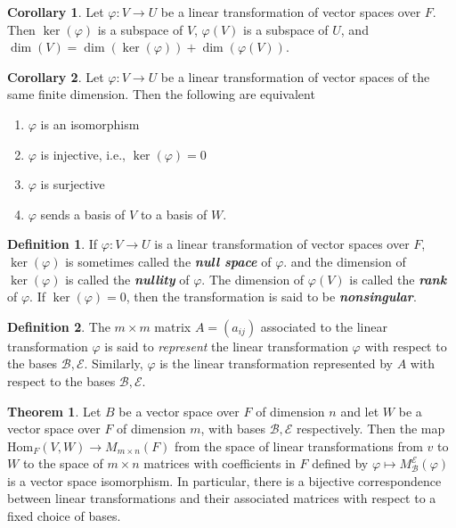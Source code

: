 \documentclass[10pt]{article}
\theoremstyle{definition}
\newtheorem{thm}{Theorem}[section]
\newtheorem*{cor}{Corollary}
\newtheorem*{defn}{Definition}
\newcommand{\nl}{\vspace{7em}}
\newcommand{\ra}{\rightarrow}
\newcommand{\vphi}{\varphi}
\newcommand{\Hom}{\text{Hom}}
\newcommand{\BB}{\mathcal{B}}
\newcommand{\EE}{\mathcal{E}}
\begin{document}
\nl

\begin{cor}
Let $\vphi:V\ra U$ be a linear transformation of vector spaces over $F$. Then $\ker(\vphi)$ is a subspace of $V$, $\vphi(V)$ is a subspace of $U$, and $\dim(V) = \dim(\ker(\vphi)) + \dim(\vphi(V))$.
\end{cor}

\nl

\begin{cor}
Let $\vphi:V\ra U$ be a linear transformation of vector spaces of the same finite dimension. Then the following are equivalent
\begin{enumerate}
\item $\vphi$ is an isomorphism
\item $\vphi$ is injective, i.e., $\ker(\vphi) = 0$
\item $\vphi$ is surjective
\item $\vphi$ sends a basis of $V$ to a basis of $W$.
\end{enumerate}
\end{cor}

\nl

\begin{defn}
If $\vphi:V\ra U$ is a linear transformation of vector spaces over $F$, $\ker(\vphi)$ is sometimes called the \textit{\textbf{null space}} of $\vphi$. and the dimension of $\ker(\vphi)$ is called the \textit{\textbf{nullity}} of $\vphi$. The dimension of $\vphi(V)$ is called the \textit{\textbf{rank}} of $\vphi$. If $\ker(\vphi) = 0$, then the transformation is said to be \textit{\textbf{nonsingular}}.
\end{defn}

\nl

\begin{defn}
The $m \times m$ matrix $A = (a_{ij})$ associated to the linear transformation $\vphi$ is said to \textit{represent} the linear transformation $\vphi$ with respect to the bases $\BB, \EE$. Similarly, $\vphi$ is the linear transformation represented by $A$ with respect to the bases $\BB, \EE$.
\end{defn}

\nl

\begin{thm}
Let $B$ be a vector space over $F$ of dimension $n$ and let $W$ be a vector space over $F$ of dimension $m$, with bases $\BB, \EE$ respectively. Then the map $\Hom_F(V, W)\ra M_{m\times n}(F)$ from the space of linear transformations from $v$ to $W$ to the space of $m\times n$ matrices with coefficients in $F$ defined by $\vphi\mapsto M_\BB^\EE(\vphi)$ is a vector space isomorphism. In particular, there is a bijective correspondence between linear transformations and their associated matrices with respect to a fixed choice of bases.
\end{thm}
\end{document}

